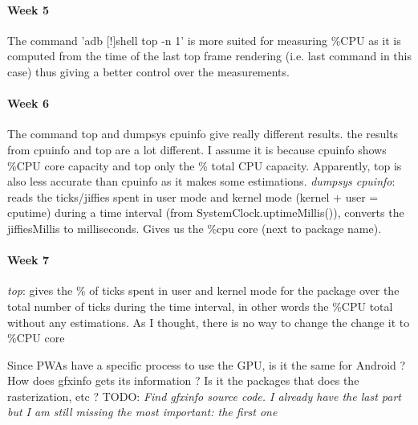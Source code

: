 \documentclass{kththesis}
\newcommand{\citationneeded}{\todo{Citation needed}[!]}
\begin{document}
\paragraph{Week 5}
The command 'adb  \citationneeded shell top -n 1' is more suited for measuring \%CPU as it is computed from the time of the last top frame rendering (i.e. last command in this case) thus giving a better control over the measurements.

\paragraph{Week 6}
The command top and dumpsys cpuinfo give really different results.
the results from cpuinfo and top are a lot different. I assume it is because cpuinfo shows \%CPU core capacity and top only the \% total CPU capacity. Apparently, top is also less accurate than cpuinfo as it makes some estimations.
\textit{dumpsys cpuinfo}: reads the ticks/jiffies spent in user mode and kernel mode (kernel + user = cputime) during a time interval (from SystemClock.uptimeMillis()), converts the jiffiesMillis to milliseconds. Gives us the \%cpu core (next to package name).
\newline
\paragraph{Week 7}
\textit{top}: gives the \% of ticks spent in user and kernel mode for the package over the total number of ticks during the time interval, in other words the \%CPU total without any estimations. As I thought, there is no way to change the change it to \%CPU core

Since PWAs have a specific process to use the GPU, is it the same for Android ? How does gfxinfo gets its information ? Is it the packages that does the rasterization, etc ?
\newline
TODO: \textit{Find gfxinfo source code. I already have the last part but I am still missing the most important: the first one}
\end{document}
